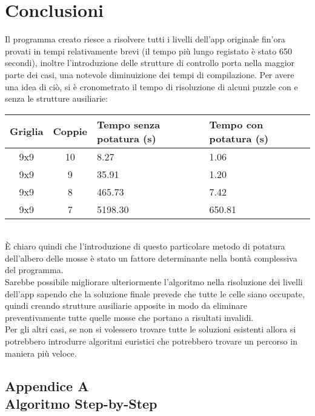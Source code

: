 \documentclass[11pt,a4paper,twocolumn]{IEEEtran}
\newcounter{algoritmo}
\begin{document}
	\section{Conclusioni}
	Il programma creato riesce a risolvere tutti i livelli dell'app originale fin'ora provati in tempi relativamente brevi (il tempo più lungo registato è stato 650 secondi), inoltre l'introduzione delle strutture di controllo porta nella maggior parte dei casi, una notevole diminuizione dei tempi di compilazione. Per avere una idea di ciò, si è cronometrato il tempo di risoluzione di alcuni puzzle con e senza le strutture ausiliarie:\bigskip\\
	\hspace*{-.6cm}
	\begin{tabular}{|c|c|C{2.4cm}|C{2.4cm}|}
		\hline 
		Griglia & Coppie & Tempo senza potatura (s) & Tempo con potatura (s) \\ 
		\hline 
		9x9 & 10 & 8.27 & 1.06 \\ 
		\hline 
		9x9 & 9 & 35.91 & 1.20 \\ 
		\hline 
		9x9 & 8 & 465.73 & 7.42 \\ 
		\hline 
		9x9 & 7 & 5198.30 & 650.81 \\ 
		\hline 
	\end{tabular}\bigskip\\
	\`{E} chiaro quindi che l'introduzione di questo particolare metodo di potatura dell'albero delle mosse è stato un fattore determinante nella bontà complessiva del programma.\\
	Sarebbe possibile migliorare ulteriormente l'algoritmo nella risoluzione dei livelli dell'app sapendo che la soluzione finale prevede che tutte le celle siano occupate, quindi creando strutture ausiliarie apposite in modo da eliminare preventivamente tutte quelle mosse che portano a risultati invalidi.\\
	Per gli altri casi, se non si volessero trovare tutte le soluzioni esistenti allora si potrebbero introdurre algoritmi euristici che potrebbero trovare un percorso in maniera più veloce.
	\clearpage
	
	\begin{appendices}
		\section*{\textbf{Appendice A}\\Algoritmo Step-by-Step}
		
	\end{appendices}
	
\fi	
\end{document}
